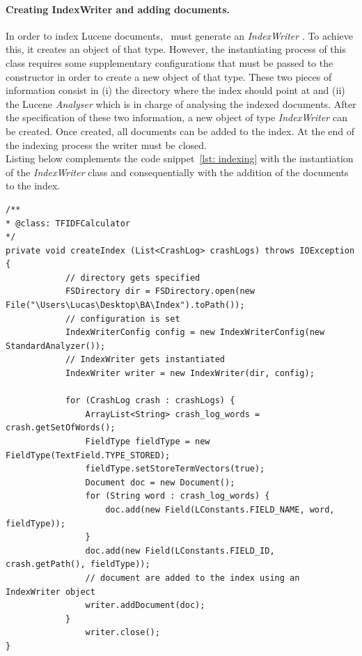 \paragraph{Creating IndexWriter and adding documents.}
In order to index Lucene documents, \toolname\ must generate an \textit{IndexWriter} \cite{luceneindexwriter}. %
To achieve this, it creates an object of that type. However, the instantiating process of this class requires some supplementary configurations that must be passed to the constructor in order to create a new object of that type. 
These two pieces of information consist in (i) the directory where the index should point at and (ii) the Lucene \textit{Analyser} which is in charge of analysing the indexed documents. 
After the specification of these two information, a new object of type \textit{IndexWriter} can be created. 
Once created, all documents can be added to the index. At the end of the indexing process the writer must be closed.\\
Listing below complements the code snippet~\ref{lst: indexing} with the instantiation of the \textit{IndexWriter} class and consequentially with the addition of the documents to the index.  
\begin{lstlisting}[caption=\TFIDF\ describing the instantiation of an IndexWriter,label={lst: indexwriter}]
/**
* @class: TFIDFCalculator
*/
private void createIndex (List<CrashLog> crashLogs) throws IOException {
			// directory gets specified
		    FSDirectory dir = FSDirectory.open(new File("\Users\Lucas\Desktop\BA\Index").toPath());
		    // configuration is set
            IndexWriterConfig config = new IndexWriterConfig(new StandardAnalyzer());
            // IndexWriter gets instantiated 
            IndexWriter writer = new IndexWriter(dir, config);
	
            for (CrashLog crash : crashLogs) {
                ArrayList<String> crash_log_words = crash.getSetOfWords();
                FieldType fieldType = new FieldType(TextField.TYPE_STORED); 
                fieldType.setStoreTermVectors(true); 
                Document doc = new Document(); 
                for (String word : crash_log_words) {
                    doc.add(new Field(LConstants.FIELD_NAME, word, fieldType)); 
                }
                doc.add(new Field(LConstants.FIELD_ID, crash.getPath(), fieldType));
                // document are added to the index using an IndexWriter object
                writer.addDocument(doc);
   			}
                writer.close();
}
    
\end{lstlisting} 
